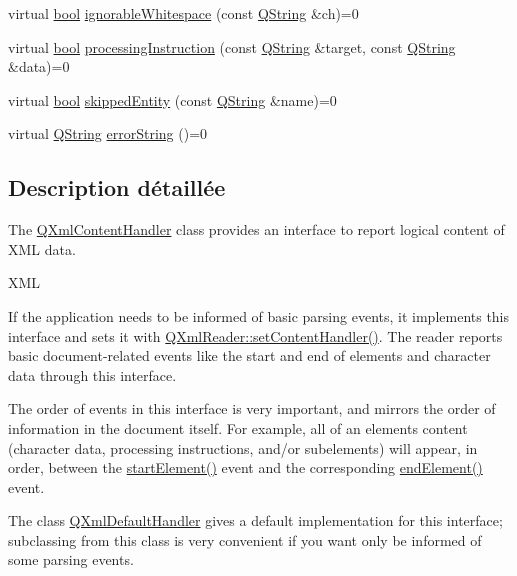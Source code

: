 \begin{DoxyCompactItemize}
\item 
virtual \hyperlink{qglobal_8h_a1062901a7428fdd9c7f180f5e01ea056}{bool} \hyperlink{class_q_xml_content_handler_a58470bd94366833c79a3c60fb350d157}{ignorable\+Whitespace} (const \hyperlink{class_q_string}{Q\+String} \&ch)=0
\item 
virtual \hyperlink{qglobal_8h_a1062901a7428fdd9c7f180f5e01ea056}{bool} \hyperlink{class_q_xml_content_handler_a520c875b64f2f06ec35001a5e50887c3}{processing\+Instruction} (const \hyperlink{class_q_string}{Q\+String} \&target, const \hyperlink{class_q_string}{Q\+String} \&data)=0
\item 
virtual \hyperlink{qglobal_8h_a1062901a7428fdd9c7f180f5e01ea056}{bool} \hyperlink{class_q_xml_content_handler_ac3b27d569634c5d7a7fac001a6cc4845}{skipped\+Entity} (const \hyperlink{class_q_string}{Q\+String} \&name)=0
\item 
virtual \hyperlink{class_q_string}{Q\+String} \hyperlink{class_q_xml_content_handler_adba96547bad1cf1b009dbfb7b7c571be}{error\+String} ()=0
\end{DoxyCompactItemize}


\subsection{Description détaillée}
The \hyperlink{class_q_xml_content_handler}{Q\+Xml\+Content\+Handler} class provides an interface to report logical content of X\+M\+L data. 

X\+M\+L

If the application needs to be informed of basic parsing events, it implements this interface and sets it with \hyperlink{class_q_xml_reader_a767bc5a20ea120ffc2d60f5c42fb28cd}{Q\+Xml\+Reader\+::set\+Content\+Handler()}. The reader reports basic document-\/related events like the start and end of elements and character data through this interface.

The order of events in this interface is very important, and mirrors the order of information in the document itself. For example, all of an element\textquotesingle{}s content (character data, processing instructions, and/or subelements) will appear, in order, between the \hyperlink{class_q_xml_content_handler_af6d4e631fad2b9b75622c95003b1da55}{start\+Element()} event and the corresponding \hyperlink{class_q_xml_content_handler_af0abc06326798a6e522f91e6174b7b9e}{end\+Element()} event.

The class \hyperlink{class_q_xml_default_handler}{Q\+Xml\+Default\+Handler} gives a default implementation for this interface; subclassing from this class is very convenient if you want only be informed of some parsing events.

